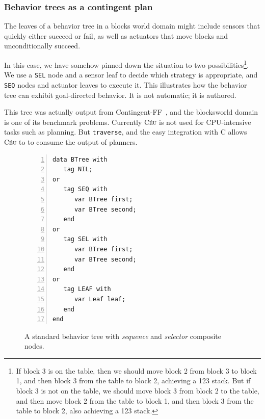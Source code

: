 \documentclass{acm_proc_article-sp}
\newcommand{\CEU}{\textsc{C\'{e}u}\xspace}
\newcommand{\code}[1] {{\small{\texttt{#1}}}}
\begin{document}
\subsubsection{Behavior trees as a contingent plan}

The leaves of a behavior tree in a blocks world domain
might include sensors that quickly either succeed or fail,
as well as actuators that move blocks and unconditionally succeed.

In this case, we have somehow pinned down the
situation to two possibilities\footnote{If block 3 is on the table,
then we should move block 2 from block 3 to block 1,
and then block 3 from the table to block 2,
achieving a 123 stack.
But if block 3 is not on the table,
we should move block 3 from block 2 to the table,
and then move block 2 from the table to block 1,
and then block 3 from the table to block 2,
also achieving a 123 stack.}.
We use a \code{SEL} node and a sensor leaf to decide which strategy is appropriate,
and \code{SEQ} nodes and actuator leaves to execute it.
This illustrates how the behavior tree can exhibit goal-directed behavior.
It is not automatic; it is authored.

This tree was actually output from Contingent-FF~\cite{hoffmann2005contingent},
and the blocksworld domain is one of its benchmark problems.
Currently \CEU is not used for CPU-intensive tasks such as planning.
But \code{traverse}, and the easy integration with C allows \CEU to
to consume the output of planners.

\begin{figure}%
\begin{lstlisting}[numbers=left,xleftmargin=3em]
data BTree with
   tag NIL;
or
   tag SEQ with
      var BTree first;
      var BTree second;
   end
or
   tag SEL with
      var BTree first;
      var BTree second;
   end
or
   tag LEAF with
      var Leaf leaf;
   end
end

\end{lstlisting}
\caption{ A standard behavior tree with \emph{sequence} and \emph{selector}
          composite nodes.
\label{lst.bt1}
}
\end{figure}
\end{document}
